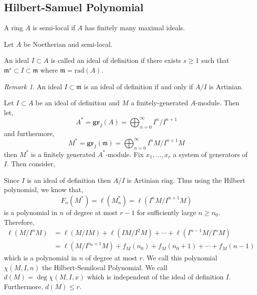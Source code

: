 \documentclass[12pt]{article}
\newcommand{\rad}[1]{\mathrm{rad}\left( #1 \right)}
\newcommand{\gr}[2]{\mathbf{gr}_{#1}\left(#2\right)}
\newcommand{\m}{\mathfrak{m}}
\theoremstyle{remark}
\newtheorem*{remark}{Remark}
\theoremstyle{definition}
\newenvironment{definition}[1][Definition:]{\begin{trivlist}
\item[\hskip \labelsep {\bfseries #1}]}{\end{trivlist}}
\begin{document}
\subsection{Hilbert-Samuel Polynomial}

\begin{definition}
A ring $A$ is semi-local if $A$ has finitely many maximal ideals.
\end{definition}

Let $A$ be Noetherian and semi-local. 

\begin{definition}
An ideal $I \subset A$ is called an ideal of definition if there exists $s \ge 1$ such that $\m^s \subset I \subset \m$ where $\m = \rad{A}$. 
\end{definition}

\begin{remark}
An ideal $I \subset \m$ is an ideal of definition if and only if $A / I$ is Artinian. 
\end{remark}

\begin{definition}
Let $I \subset A$ be an ideal of definition and $M$ a finitely-generated $A$-module. Then let,
\[ A^* = \gr{I}{A} = \bigoplus_{n = 0}^{\infty} I^n / I^{n+1} \]
and furthermore,
\[ M^* = \gr{I}{\m} = \bigoplus_{n = 0}^\infty I^n M / I^{n+1} M \]
then $M^*$ is a finitely generated $A^*$-module. Fix $x_1, \dots, x_r$ a system of generators of $I$. Then consider,
\begin{center}
\end{center}
Since $I$ is an ideal of definition then $A / I$ is Artinian ring. Thus using the Hilbert polynomial, we know that,
\[ F_n(M^*) = \ell(M_n^*) = \ell(I^n M / I^{n+1}M) \]
is a polynomial in $n$ of degree at most $r - 1$ for sufficiently large $n \ge n_0$. Therefore,
\begin{align*}
\ell(M / I^n M) & = \ell(M/IM) + \ell(IM/I^2M) + \cdots + \ell(I^{n-1}M/I^n M) 
\\
& = \ell(M / I^{n_0 + 1}M) + f_M(n_0) + f_M(n_0 + 1) + \cdots + f_M(n-1) 
\end{align*}
which is a polynomial in $n$ of degree at most $r$. We call this polynomial $\chi(M, I, n)$ the Hilbert-Semilocal Polynomial. We call $d(M) = \deg{\chi(M, I, x)}$ which is independent of the ideal of definition $I$. Furthermore, $d(M) \le r$.   
\end{definition}
\end{document}
